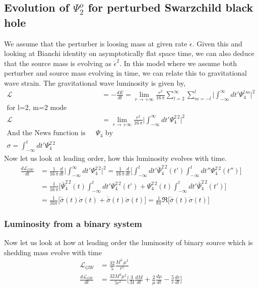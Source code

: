 \documentclass[prd,preprintnumbers,onecolumn,eqsecnum,floatfix,letter]{revtex4}
\begin{document}
\subsection{Evolution of $\Psi^{o}_{2}$ for perturbed Swarzchild black hole }
We assume that the perturber is loosing mass at given rate $\dot{\epsilon}$. Given this and looking at Bianchi identity on asymptotically flat space time, we can also deduce that the source mass is evolving as $\dot{\epsilon}^2$. In this model where we assume both perturber and source mass evolving in time, we can relate this to gravitational wave strain. The gravitational wave luminosity is given by,
\begin{align}
	\mathcal{L} &= -\frac{dE}{dt} = \lim_{r \to +\infty} \frac{r^2}{16\,\pi}\sum_{l=2}^{\infty}\sum_{m=-l}^{l}\Big|\int_{-\infty}^{\infty}dt'\Psi_{4}^{l\,m}\Big|^2 \nonumber \\
	\text{for l=2, m=2 mode}\\
	\mathcal{L} &=  \lim_{r \to +\infty} \frac{r^2}{16\,\pi}\Big|\int_{-\infty}^{\infty}dt'\Psi_{4}^{2\,2}\Big|^2 \\
	\text{And the News function is related to $\Psi_4$ by} \nonumber\\
\sigma = \int_{-\infty}^{t}dt'\Psi_{4}^{2\,2} 
\end{align}
 Now let us look at leading order, how this luminosity evolves with time.
 \begin{align}
 	\frac{d\mathcal{L}_{GW}}{dt} &=  \frac{1}{16\,\pi}\frac{d}{dt}\Big|\int_{-\infty}^{\infty}dt'\Psi_{4}^{2\,2}\Big|^2 = \frac{1}{16\,\pi}\frac{d}{dt}\Big[\int_{-\infty}^{t}dt'\bar{\Psi}_{4}^{2\,2}(t')\int_{-\infty}^{t}dt''\Psi_{4}^{2\,2}(t'')\Big]\\
 	&=\frac{1}{16\,\pi}\Big[\bar{\Psi}_{4}^{2\,2}(t)\int_{-\infty}^{t}dt'\Psi_{4}^{2\,2}(t') + \Psi_{4}^{2\,2}(t)\int_{-\infty}^{t}dt'\bar{\Psi}_{4}^{2\,2}(t')\Big] \nonumber\\
 	&=\frac{1}{16\pi}\Big[\ddot{\bar{\sigma}}(t)\dot{\sigma}(t) + \dot{\bar{\sigma}}(t)\ddot{\sigma}(t)\Big] = \frac{1}{8\pi}\Re\Big[\ddot{\bar{\sigma}}(t)\dot{\sigma}(t)\Big]\nonumber
 \end{align}
 
 \subsubsection{Luminosity from a binary system}
 
 Now let us look at how at leading order the luminosity of binary source which is shedding mass evolve with time 
 \begin{align}
 	\mathcal{L}_{GW} & = \frac{32}{5}\frac{M^3\,\mu^2}{r^5}\nonumber\\
 	\frac{d\mathcal{L}_{GW}}{dt} & = \frac{32M^3\mu^2}{5r^5}\Big[\frac{3}{M}\frac{dM}{dt} + \frac{2}{\mu}\frac{d\mu}{dt} - \frac{5}{r}\frac{dr}{dt}\Big]
 \end{align}
 
\end{document}
